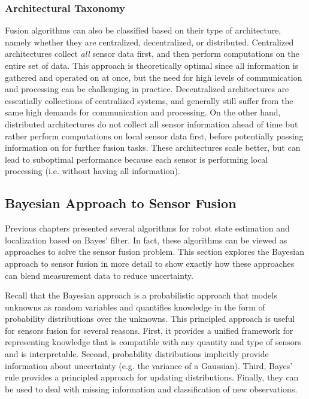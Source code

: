 \subsubsection{Architectural Taxonomy}
Fusion algorithms can also be classified based on their type of architecture, namely whether they are centralized, decentralized, or distributed. Centralized architectures collect \textit{all} sensor data first, and then perform computations on the entire set of data. This approach is theoretically optimal since all information is gathered and operated on at once, but the need for high levels of communication and processing can be challenging in practice. Decentralized architectures are essentially collections of centralized systems, and generally still suffer from the same high demands for communication and processing. On the other hand, distributed architectures do not collect all sensor information ahead of time but rather perform computations on local sensor data first, before potentially passing information on for further fusion tasks. These architectures scale better, but can lead to suboptimal performance because each sensor is performing local processing (i.e. without having all information).

\subsection{Bayesian Approach to Sensor Fusion}
Previous chapters presented several algorithms for robot state estimation and localization based on Bayes' filter. In fact, these algorithms can be viewed as approaches to solve the sensor fusion problem. This section explores the Bayesian approach to sensor fusion in more detail to show exactly how these approaches can blend measurement data to reduce uncertainty.

Recall that the Bayesian approach is a probabilistic approach that models unknowns as random variables and quantifies knowledge in the form of probability distributions over the unknowns. This principled approach is useful for sensors fusion for several reasons. First, it provides a unified framework for representing knowledge that is compatible with any quantity and type of sensors and is interpretable. Second, probability distributions implicitly provide information about uncertainty (e.g. the variance of a Gaussian). Third, Bayes' rule provides a principled approach for updating distributions. Finally, they can be used to deal with missing information and classification of new observations.

